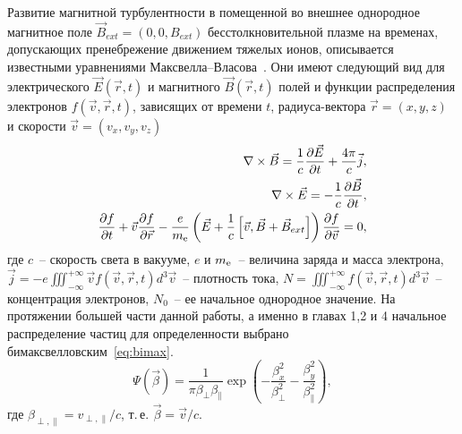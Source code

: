 Развитие магнитной турбулентности в помещенной во внешнее однородное магнитное поле $\vec{B}_{ext}=(0, 0, B_{ext})$ бесстолкновительной плазме на временах, допускающих пренебрежение движением тяжелых ионов, описывается известными уравнениями  Максвелла--Власова~\cite{???}. 
Они имеют следующий вид  для электрического $\vec{E}(\vec{r}, t)$ и магнитного $\vec{B}(\vec{r}, t)$ полей и функции распределения электронов $f(\vec{v},\vec{r}, t)$, зависящих от времени $t$, радиуса-вектора $\vec{r}=\left(x,y,z\right)$ и скорости $\vec{v}=\left(v_x,v_y,v_z\right)$
\begin{align}
     \label{eq:maxw1} 
    \nabla \times \vec{B}=\dfrac{1}{c}\dfrac{\partial \vec{E}}{\partial t}+\dfrac{4\pi}{c}\vec{j}, \\
    \label{eq:maxw2}
    \nabla \times \vec{E}=-\dfrac{1}{c}\dfrac{\partial \vec{B}}{\partial t}, \\
    \dfrac{\partial f}{\partial t}+\vec{v}\dfrac{\partial f}{\partial \vec{r}}-\dfrac{e}{m_\mathrm{e}} \left(\vec{E}+\dfrac{1}{c}\left[\vec{v},\vec{B}+\vec{B}_{ext}\right]\right) \dfrac{\partial f}{\partial \vec{v}}=0,
    \label{eq:Vlasov}
\end{align}
где $c$~-- скорость света в вакууме, $e$ и $m_\mathrm{e}$~-- величина заряда и масса электрона, $\vec{j}=-e\iiint^{+\infty}_{-\infty}\vec{v}f(\vec{v},\vec{r}, t) d^3\vec{v}$~-- плотность тока, $N=\iiint^{+\infty}_{-\infty}f(\vec{v},\vec{r}, t) d^3\vec{v}$~-- концентрация электронов, $N_0$~-- ее начальное однородное значение.
На протяжении большей части данной работы, а именно в главах 1,2 и 4 начальное распределение частиц для определенности выбрано бимаксвелловским~\ref{eq:bimax}. 
\begin{equation}
\label{eq:bimax}
\Psi(\vec{\beta})=\dfrac{1}{\pi\beta_{\perp} \beta_{\|} } \exp\left(-\dfrac{\beta_x^2}{\beta_{\perp}^2}-\dfrac{\beta_y^2}{\beta_{\|}^2}\right),
\end{equation}
где $\beta_{\perp,\|}={v_{\perp,\|}}/{c}$, т.\,е. $\vec{\beta}=\vec{v}/{c}$.

